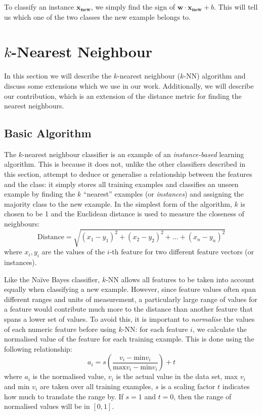 To classify an instance $\mathbf{x_{new}}$, we simply find the sign of
$\mathbf{w}\cdot\mathbf{x_{new}}+b$. This will tell us which one of the
two classes the new example belongs to.

\section{$k$-Nearest Neighbour}
In this section we will describe the $k$-nearest neighbour ($k$-NN) algorithm
and discuss some extensions which we use in our work. Additionally, we will
describe our contribution, which is an extension of the distance metric for
finding the nearest neighbours.

\subsection{Basic Algorithm}
The $k$-nearest neighbour classifier is an example of an
\textit{instance-based} learning algorithm. This is because it does not, unlike
the other classifiers described in this section, attempt to deduce or
generalise a relationship between the features and the class: it simply stores
all training examples and classifies an unseen example by finding the $k$
``nearest'' examples (or \textit{instances}) and assigning the majority class
to the new example. In the simplest form of the algorithm, $k$ is chosen to be
1 and the Euclidean distance is used to measure the closeness of neighbours:
\begin{equation*}
\mathrm{Distance} = \sqrt{(x_1-y_1)^2 + (x_2-y_2)^2 + \ldots + (x_n-y_n)^2}
\end{equation*}
where $x_i,y_i$ are the values of the $i$-th feature for two different feature
vectors (or instances).

Like the Na\"{i}ve Bayes classifier, $k$-NN allows all features to be taken
into account equally when classifying a new example. However, since feature
values often span different ranges and units of measurement, a particularly
large range of values for a feature would contribute much more to the distance
than another feature that spans a lower set of values.
To avoid this, it is important to \textit{normalise} the
values of each numeric feature before using $k$-NN: for each feature $i$, we
calculate the normalised value of the feature for each training example. This
is done using the following relationship:
\begin{equation*}
a_i = s\left(\dfrac{v_i - \mathrm{min }v_i}{\mathrm{max }v_i - \mathrm{min }v_i}\right) + t
\end{equation*}
where $a_i$ is the normalised value, $v_i$ is the actual value in the data
set, max $v_i$ and min $v_i$ are taken over all training examples, $s$ is a
scaling factor $t$ indicates how much to translate the range by. If $s=1$
and $t=0$, then the range of normalised values will be in $[0,1]$.

